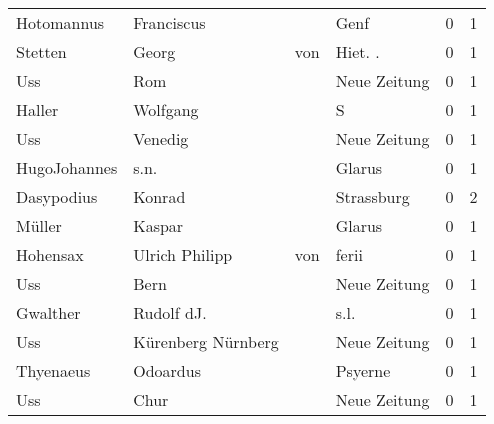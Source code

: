 \begin{tabular}{llllrr}
               Hotomannus &                         Franciscus &             &                                        Genf &          0 &         1 \\
                  Stetten &                              Georg &         von &                                    Hiet. .  &          0 &         1 \\
                      Uss &                                Rom &             &                                Neue Zeitung &          0 &         1 \\
                   Haller &                           Wolfgang &             &                                           S &          0 &         1 \\
                      Uss &                            Venedig &             &                                Neue Zeitung &          0 &         1 \\
             HugoJohannes &                               s.n. &             &                                      Glarus &          0 &         1 \\
               Dasypodius &                             Konrad &             &                                  Strassburg &          0 &         2 \\
                   Müller &                             Kaspar &             &                                      Glarus &          0 &         1 \\
                 Hohensax &                     Ulrich Philipp &         von &                                       ferii &          0 &         1 \\
                      Uss &                               Bern &             &                                Neue Zeitung &          0 &         1 \\
                 Gwalther &                         Rudolf dJ. &             &                                        s.l. &          0 &         1 \\
                      Uss &                 Kürenberg Nürnberg &             &                                Neue Zeitung &          0 &         1 \\
                Thyenaeus &                           Odoardus &             &                                     Psyerne &          0 &         1 \\
                      Uss &                               Chur &             &                                Neue Zeitung &          0 &         1 \\

\end{tabular}
